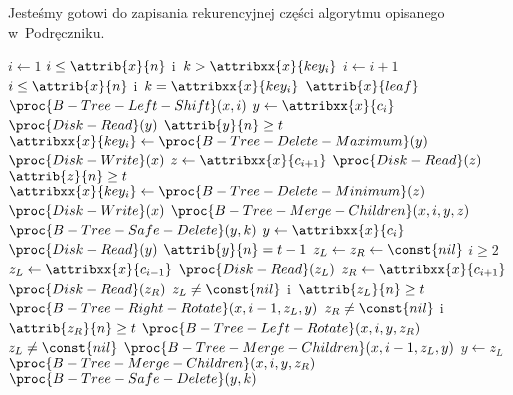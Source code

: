 Jesteśmy gotowi do zapisania rekurencyjnej części algorytmu opisanego w~Podręczniku.
\begin{codebox}
    \li $i\gets1$ \label{li:b-tree-safe-delete-search-begin}
    \li \While $i\le\attrib{x}{n}$ i~$k>\attribxx{x}{key_i}$
    \li     \Do $i\gets i+1$
            \End \label{li:b-tree-safe-delete-search-end}
    \li \If $i\le\attrib{x}{n}$ i~$k=\attribxx{x}{key_i}$
    \li     \Then \If $\attrib{x}{leaf}$
    \li         \Then $\proc{B-Tree-Left-Shift}(x,i)$ \label{li:b-tree-safe-delete-remove-from-leaf}
    \li         \Else $y\gets\attribxx{x}{c_i}$ \label{li:b-tree-safe-delete-remove-predecessor-begin}
    \li             $\proc{Disk-Read}(y)$
    \li             \If $\attrib{y}{n}\ge t$
    \li                 \Then $\attribxx{x}{key_i}\gets\proc{B-Tree-Delete-Maximum}(y)$
    \li                     $\proc{Disk-Write}(x)$ \label{li:b-tree-safe-delete-remove-predecessor-end}
    \li                 \Else $z\gets\attribxx{x}{c_{i+1}}$ \label{li:b-tree-safe-delete-remove-successor-begin}
    \li                     $\proc{Disk-Read}(z)$
    \li                     \If $\attrib{z}{n}\ge t$
    \li                         \Then $\attribxx{x}{key_i}\gets\proc{B-Tree-Delete-Minimum}(z)$
    \li                             $\proc{Disk-Write}(x)$ \label{li:b-tree-safe-delete-remove-successor-end}
    \li                         \Else $\proc{B-Tree-Merge-Children}(x,i,y,z)$ \label{li:b-tree-safe-delete-remove-merge-children-1}
    \li                             $\proc{B-Tree-Safe-Delete}(y,k)$ \label{li:b-tree-safe-delete-recursive-call-1}
                                \End
                        \End
                \End
    \li     \Else $y\gets\attribxx{x}{c_i}$
    \li         $\proc{Disk-Read}(y)$
    \li         \If $\attrib{y}{n}=t-1$
    \li             \Then $z_L\gets z_R\gets\const{nil}$
    \li                 \If $i\ge2$
    \li                     \Then $z_L\gets\attribxx{x}{c_{i-1}}$
    \li                         $\proc{Disk-Read}(z_L)$
    \li                     \Else $z_R\gets\attribxx{x}{c_{i+1}}$
    \li                         $\proc{Disk-Read}(z_R)$
                            \End
    \li                 \If $z_L\ne\const{nil}$ i~$\attrib{z_L}{n}\ge t$ \label{li:b-tree-safe-delete-rotations-begin}
    \li                     \Then $\proc{B-Tree-Right-Rotate}(x,i-1,z_L,y)$
    \li                     \ElseIf $z_R\ne\const{nil}$ i~$\attrib{z_R}{n}\ge t$
    \li                         \Then $\proc{B-Tree-Left-Rotate}(x,i,y,z_R)$ \label{li:b-tree-safe-delete-rotations-end}
    \li                     \ElseIf $z_L\ne\const{nil}$ \label{li:b-tree-safe-delete-remove-mergers-begin}
    \li                         \Then $\proc{B-Tree-Merge-Children}(x,i-1,z_L,y)$
    \li                             $y\gets z_L$
    \li                     \ElseNoIf $\proc{B-Tree-Merge-Children}(x,i,y,z_R)$
                            \End \label{li:b-tree-safe-delete-remove-mergers-end}
                    \End \label{li:b-tree-safe-delete-key-brothers-end}
    \li         $\proc{B-Tree-Safe-Delete}(y,k)$ \label{li:b-tree-safe-delete-recursive-call-2}
            \End
\end{codebox}
